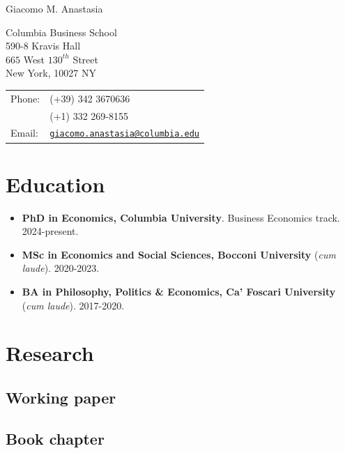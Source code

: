 \documentclass[letterpaper, 12pt]{article}
\def\name{Giacomo M. Anastasia}
\begin{document}
{\huge \name}


\vspace{0.15in}


\begin{minipage}{0.5\linewidth}
 Columbia Business School \\
 590-8 Kravis Hall \\
   $665$ West $130^{th}$ Street \\
   New York, 10027 NY
\end{minipage}
\begin{minipage}{0.5\linewidth}
  \begin{tabular}{ll}
    Phone: & (+39) 342 3670636 \\
    & (+1) 332 269-8155 \\
    Email: & \href{mailto:giacomo.anastasia@columbia.edu}{\tt giacomo.anastasia@columbia.edu} 
  \end{tabular}
\end{minipage}
\smallskip
\section*{Education}
\begin{itemize} 
  \item[] \textbf{PhD in Economics, Columbia University}. Business Economics track. 2024-present.
  \item[] \textbf{MSc in Economics and Social Sciences, Bocconi University} (\textit{cum laude}).  2020-2023.
  \item[] \textbf{BA in Philosophy, Politics \& Economics, Ca' Foscari University} (\textit{cum laude}). 2017-2020.
\end{itemize}

\section*{Research}
\nocite{*}

\subsection*{Working paper}
\printbibliography[keyword=wp,heading=none]

\subsection*{Book chapter}
\printbibliography[keyword=chapter,heading=none]
\end{document}
